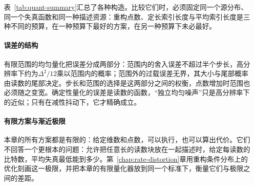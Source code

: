 表~\ref{tab:quant-summary}汇总了各种构造。比较它们时，必须固定同一个源分布、同一个失真函数和同一种描述资源：重构点数、定长索引长度与平均索引长度是三种不同的预算，在一种预算下最好的方案，在另一种预算下未必最好。

\paragraph{误差的结构}
有限范围的均匀量化把误差分成两部分：范围内的舍入误差不超过半个步长，高分辨率下约为$\Delta^{2}/12$乘以范围内的概率；范围外的过载误差无界，其大小与尾部概率由读数的尾部决定。步长和范围的选择是这两部分之间的权衡，点数增加时范围也必须随之变宽。确定性量化的误差是读数的函数，“独立均匀噪声”只是高分辨率下的近似；只有在减性抖动下，它才精确成立。

\paragraph{有限方案与渐近极限}
本章的所有方案都是有限的：给定维数和点数，可以执行，也可以算出代价。它们不回答一个更根本的问题：允许把任意长的读数块放在一起描述时，给定每读数的比特数，平均失真最低能到多少。第~\ref{chap:rate-distortion}章用重构条件分布上的优化刻画这一极限，并把本章的有限量化器放到同一个标准下，衡量它们与极限之间的差距。
